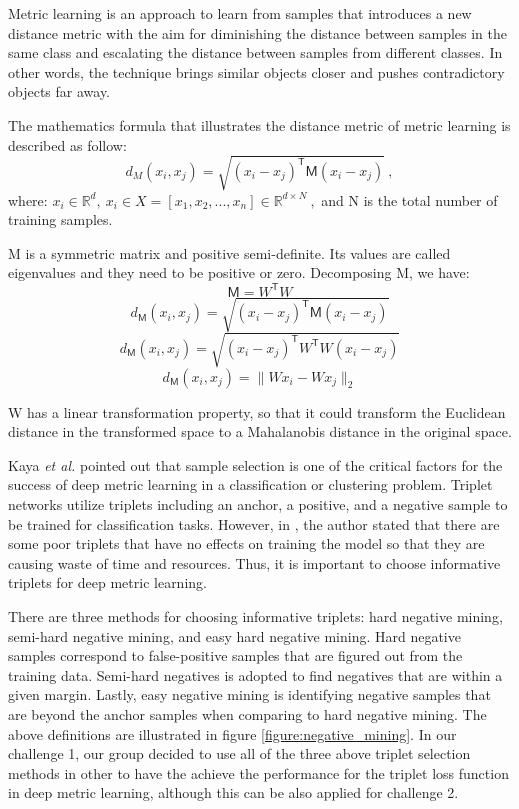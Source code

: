 \documentclass[10pt,twocolumn,letterpaper]{article}
\begin{document}
Metric learning is an approach to learn from samples that introduces a new distance metric with the aim for diminishing the distance between samples in the same class and escalating the distance between samples from different classes. In other words, the technique brings similar objects closer and pushes contradictory objects far away.
\newline

The mathematics formula that illustrates the distance metric of metric learning is described as follow:
\[
d_{M}(x_i,x_j)=\sqrt{(x_i-x_j)^\mathsf{T}\mathsf{M}(x_i-x_j)}\ ,
\]
where: \(x_i \in \mathbb{R}^d,\ x_i \in X=[x_1,x_2,...,x_n] \in \mathbb{R}^{d\times N}\ ,\) and N is the total number of training samples.
\newline

M is a symmetric matrix and positive semi-definite. Its values are called eigenvalues and they need to be positive or zero. Decomposing M, we have:
\[
\mathsf{M}=W^\mathsf{T}W
\]
\[
d_{\mathsf{M}}(x_i,x_j)=\sqrt{(x_i-x_j)^{\mathsf{T}}\mathsf{M}(x_i-x_j)}
\]
\[
d_{\mathsf{M}}(x_i,x_j)=\sqrt{(x_i-x_j)^{\mathsf{T}}W^{\mathsf{T}}W(x_i-x_j)}
\]
\[
d_{\mathsf{M}}(x_i,x_j)=\|Wx_i-Wx_j\|_2
\]

W has a linear transformation property, so that it could transform the Euclidean distance in the transformed space to a Mahalanobis distance in the original space.
\newline

Kaya \textit{et al.} pointed out that sample selection is one of the critical factors for the success of deep metric learning in a classification or clustering problem. Triplet networks utilize triplets including an anchor, a positive, and a negative sample to be trained for classification tasks. However, in \cite{cui2016finegrained}, the author stated that there are some poor triplets that have no effects on training the model so that they are causing waste of time and resources. Thus, it is important to choose informative triplets for deep metric learning.
\newline

There are three methods for choosing informative triplets: hard negative mining, semi-hard negative mining, and easy hard negative mining. Hard negative samples correspond to false-positive samples that are figured out from the training data. Semi-hard negatives is adopted to find negatives that are within a given margin. Lastly, easy negative mining is identifying negative samples that are beyond the anchor samples when comparing to hard negative mining. The above definitions are illustrated in figure \ref{figure:negative_mining}. In our challenge 1, our group decided to use all of the three above triplet selection methods in other to have the achieve the performance for the triplet loss function in deep metric learning, although this can be also applied for challenge 2.
\end{document}
